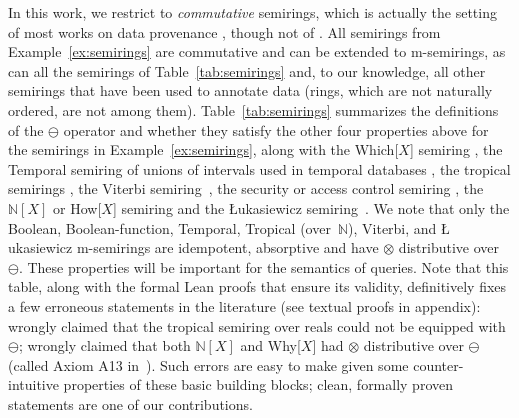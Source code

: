 In this work, we restrict to \emph{commutative} semirings, which is
actually the setting of most works on data provenance
\cite{green2007provenance,geerts2010database}, though not of
\cite{sen2026provsql}.
All semirings from Example~\ref{ex:semirings} are commutative
and can be extended to m-semirings, as can all the semirings of
Table~\ref{tab:semirings} and, to our knowledge, all other semirings that
have been used to annotate data (rings, which are not naturally ordered,
are not among them).
Table~\ref{tab:semirings} summarizes the definitions of the $\ominus$
operator and whether they satisfy the other four properties above for
the semirings in Example~\ref{ex:semirings}, along with the
Which[$X$] semiring \cite{green2017provenance}, the
Temporal semiring of unions of intervals
used in temporal databases
\cite{widiaatmaja2025demonstration}, the tropical semirings
\cite{green2007provenance}, the Viterbi semiring~\cite{green2017provenance}, the security or access control semiring
\cite{green2017provenance}, the $\mathbb{N}[X]$ or How[$X$] semiring
\cite{green2007provenance} and the \L ukasiewicz semiring~\cite{gradel2025provenance}.
We note that only the Boolean, Boolean-function, Temporal, Tropical (over~$\mathbb{N}$), Viterbi, and \L
ukasiewicz m-semirings are idempotent, absorptive and have $\otimes$
distributive over $\ominus$.
These properties will be important for the semantics of 
queries. Note that this table, along with the formal Lean proofs that
ensure its validity, definitively fixes
a
few erroneous statements in the literature (see textual proofs in
appendix):
\cite[Example~4]{geerts2010database}
wrongly claimed that the tropical semiring over reals could not be equipped with
$\ominus$; \cite{amsterdamer2011limitations} wrongly claimed that
both $\mathbb{N}[X]$ and Why[$X$] had $\otimes$ distributive over $\ominus$
(called Axiom A13 in~\cite{amsterdamer2011limitations}). Such errors are
easy to make given some counter-intuitive properties of
these basic building blocks; clean, formally proven statements
are one of our contributions.

